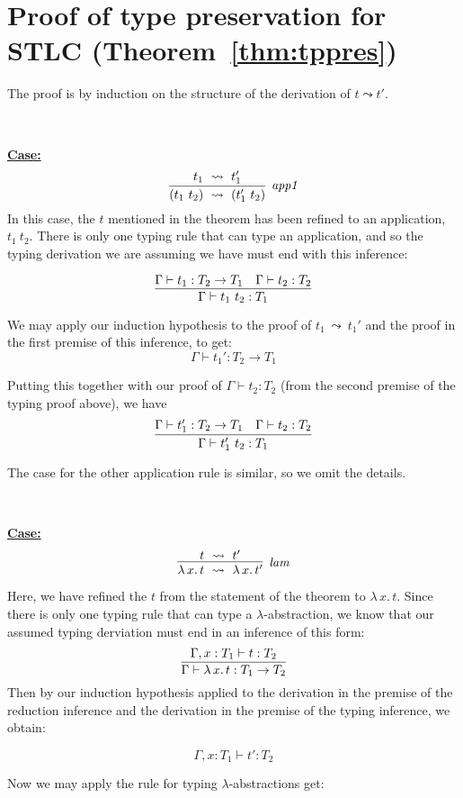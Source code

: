 \documentclass{article}
\providecommand{\lamrule}[0]{\infer[\textit{lam}]{\lambda\,x.\, t\ \leadsto\ \lambda\,x.\, t'}
                               {t\ \leadsto\ t'}}
\providecommand{\apparule}[0]{\infer[\textit{app1}]{(t_1\ t_2)\ \leadsto\ (t_1'\ t_2)}
                                {t_1\ \leadsto\ t_1'}}
\begin{document}


\appendix

\section{Proof of type preservation for STLC (Theorem~\ref{thm:tppres})}
\label{sec:tppres}

The proof is
  by induction on the structure of the derivation of $t \leadsto t'$.  

\ 

\noindent \underline{\textbf{Case:}}
\[
\apparule
\]
\noindent In this case, the $t$ mentioned in the theorem has been
refined to an application, $t_1\ t_2$.  There is only one typing rule that
can type an application, and so the typing derivation we are assuming
we have must end with this inference:

\[
\infer{\Gamma \vdash t_1\ t_2 : T_1}
      {\Gamma \vdash t_1 : T_2 \to T_1 & \Gamma \vdash t_2 : T_2}
\]

\noindent We may apply our induction hypothesis to the proof of $t_1\
\leadsto\ t_1'$ and the proof in the first premise of this inference,
to get:
\[ 
\Gamma \vdash t_1' : T_2\to T_1
\]

\noindent Putting this together with our proof of $\Gamma \vdash t_2 : T_2$
(from the second premise of the typing proof above), we have
\[
\infer{\Gamma \vdash t_1'\ t_2: T_1}
{\Gamma \vdash t_1' : T_2\to T_1 & \Gamma \vdash t_2:T_2}
\]

\noindent The case for the other application rule is similar, so we omit the details.

\ 

\noindent \underline{\textbf{Case:}}
\[
\lamrule
\]

\noindent Here, we have refined the $t$ from the statement of the theorem
to $\lambda\,x.\, t$.  Since there is only one typing rule that can type
a $\lambda$-abstraction, we know that our assumed typing derviation must
end in an inference of this form:
\[ 
\infer{\Gamma\vdash \lambda\,x.\,t : T_1 \to T_2}
      {\Gamma,x:T_1\vdash t:T_2}
\]
\noindent Then by our induction hypothesis applied to the derivation in
the premise of the reduction inference and the derivation in the premise
of the typing inference, we obtain:

\[ 
\Gamma, x:T_1 \vdash t' : T_2
\]
       
\noindent Now we may apply the rule for typing $\lambda$-abstractions get:
\end{document}

